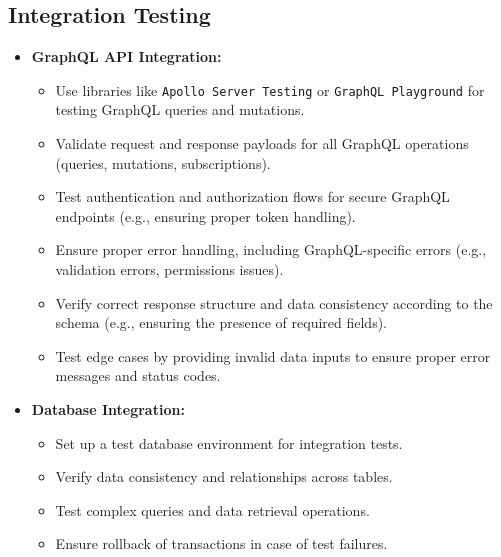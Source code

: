 \subsection{Integration Testing}
\begin{itemize}[leftmargin=*]
    \item \textbf{GraphQL API Integration:}
    \begin{itemize}
        \item Use libraries like \texttt{Apollo Server Testing} or \texttt{GraphQL Playground} for testing GraphQL queries and mutations.
        \item Validate request and response payloads for all GraphQL operations (queries, mutations, subscriptions).
        \item Test authentication and authorization flows for secure GraphQL endpoints (e.g., ensuring proper token handling).
        \item Ensure proper error handling, including GraphQL-specific errors (e.g., validation errors, permissions issues).
        \item Verify correct response structure and data consistency according to the schema (e.g., ensuring the presence of required fields).
        \item Test edge cases by providing invalid data inputs to ensure proper error messages and status codes.
    \end{itemize}

        \item \textbf{Database Integration:}
    \begin{itemize}
        \item Set up a test database environment for integration tests.
        \item Verify data consistency and relationships across tables.
        \item Test complex queries and data retrieval operations.
        \item Ensure rollback of transactions in case of test failures.
    \end{itemize}
\end{itemize}
    



